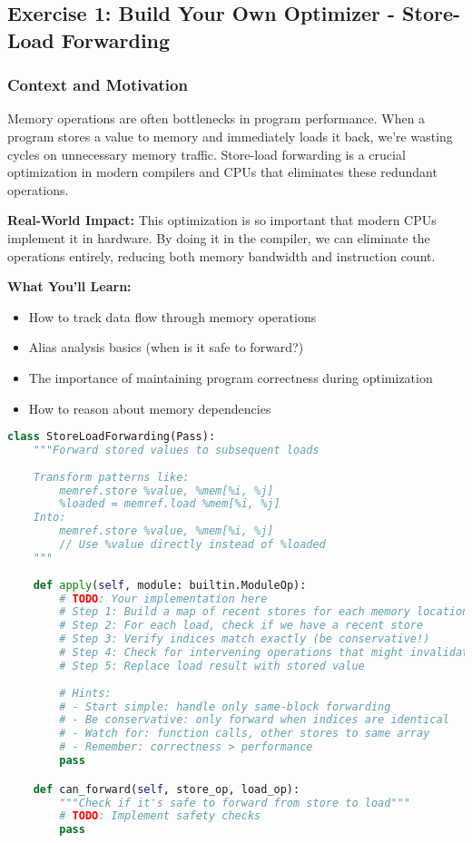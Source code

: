 \documentclass[11pt,a4paper]{article}
\begin{document}
\subsection{Exercise 1: Build Your Own Optimizer - Store-Load Forwarding}

\subsubsection{Context and Motivation}

Memory operations are often bottlenecks in program performance. When a program stores a value to memory and immediately loads it back, we're wasting cycles on unnecessary memory traffic. Store-load forwarding is a crucial optimization in modern compilers and CPUs that eliminates these redundant operations.

\textbf{Real-World Impact:} This optimization is so important that modern CPUs implement it in hardware. By doing it in the compiler, we can eliminate the operations entirely, reducing both memory bandwidth and instruction count.

\textbf{What You'll Learn:}
\begin{itemize}
    \item How to track data flow through memory operations
    \item Alias analysis basics (when is it safe to forward?)
    \item The importance of maintaining program correctness during optimization
    \item How to reason about memory dependencies
\end{itemize}

\begin{lstlisting}[language=Python, caption=Exercise: Store-Load Forwarding]
class StoreLoadForwarding(Pass):
    """Forward stored values to subsequent loads
    
    Transform patterns like:
        memref.store %value, %mem[%i, %j]
        %loaded = memref.load %mem[%i, %j]
    Into:
        memref.store %value, %mem[%i, %j]
        // Use %value directly instead of %loaded
    """
    
    def apply(self, module: builtin.ModuleOp):
        # TODO: Your implementation here
        # Step 1: Build a map of recent stores for each memory location
        # Step 2: For each load, check if we have a recent store
        # Step 3: Verify indices match exactly (be conservative!)
        # Step 4: Check for intervening operations that might invalidate
        # Step 5: Replace load result with stored value
        
        # Hints:
        # - Start simple: handle only same-block forwarding
        # - Be conservative: only forward when indices are identical
        # - Watch for: function calls, other stores to same array
        # - Remember: correctness > performance
        pass

    def can_forward(self, store_op, load_op):
        """Check if it's safe to forward from store to load"""
        # TODO: Implement safety checks
        pass
\end{lstlisting}
\end{document}
